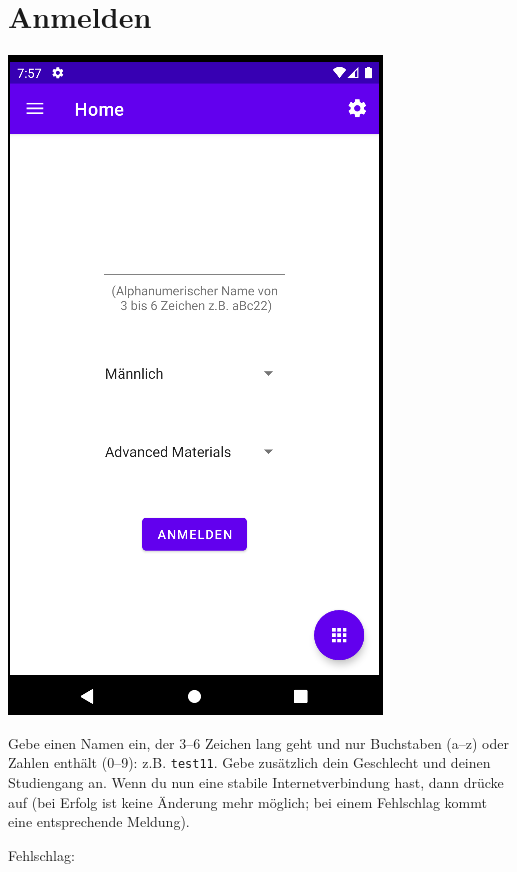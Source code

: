 \documentclass[ngerman]{tutorial}
\begin{document}
\section{Anmelden}
\begin{center}
    \includegraphics[scale=0.5]{start_reg.png}
\end{center}
Gebe einen Namen ein, der 3--6 Zeichen lang geht und nur Buchstaben (a--z) oder Zahlen enthält (0--9): z.B. \texttt{test11}. Gebe zusätzlich dein Geschlecht und deinen Studiengang an. Wenn du nun eine stabile Internetverbindung hast, dann drücke auf  (bei Erfolg ist keine Änderung mehr möglich; bei einem Fehlschlag kommt eine entsprechende Meldung).
\newpage
\begin{center}
    Fehlschlag:
\end{center}
\end{document}
